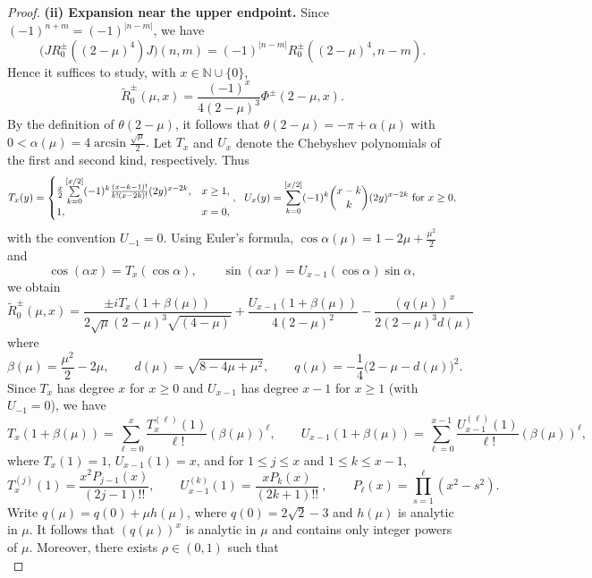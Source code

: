 \documentclass[reqno, 11pt]{amsart}
\newcommand\N{\mathbb{N}}
\numberwithin{equation}{section}
\begin{document}
\begin{proof}
\vskip0.1cm
\textbf{(ii) Expansion near the upper endpoint.}
Since $(-1)^{n+m}=(-1)^{|n-m|}$, we have
\[
\bigl(JR_0^{\pm}((2-\mu)^4)J\bigr)(n,m)
=(-1)^{|n-m|}R_0^{\pm}((2-\mu)^4,n-m).
\]
Hence it suffices to study, with $x\in\N\cup\{0\}$,
\begin{equation*}
\widetilde{R}^{\pm}_0(\mu,x)=\frac{(-1)^x}{4(2-\mu)^3}\Phi^{\pm}(2-\mu,x).
\end{equation*}
By the definition of $\theta(2-\mu)$, it follows that
$\theta(2-\mu)=-\pi+\alpha(\mu)$ with $0<\alpha(\mu)=4\arcsin{\frac{\sqrt{\mu}}{2}}.$
Let $T_x$ and $U_x$ denote the Chebyshev polynomials of the first and second kind, respectively. Thus
\[
T_x(y)=
\begin{cases}
\frac{x}{2}\sum\limits_{k=0}^{[x/2]}(-1)^k
\frac{(x-k-1)!}{k!(x-2k)!}(2y)^{x-2k},&x\geq1,\\
1,&x=0,
\end{cases},\ \ 
U_x(y)=\sum_{k=0}^{[x/2]}(-1)^k
\binom{x-k}{k}(2y)^{x-2k}\ {\rm for}\  x\geq0,
\]
with the convention $U_{-1}=0$.
Using Euler's formula, $\cos\alpha(\mu)=1-2\mu+\frac{\mu^2}{2}$ and 
$$\cos (\alpha x)=T_x(\cos \alpha),\qquad \sin (\alpha x)= U_{x-1}(\cos\alpha)\sin \alpha,$$
we obtain
\begin{equation}\label{eq:upper-cheb}
\widetilde{R}^{\pm}_0(\mu,x)=\frac{\pm iT_x(1+\beta(\mu))}{2\sqrt{\mu}(2-\mu)^3\sqrt{(4-\mu)}}+\frac{U_{x-1}(1+\beta(\mu))}{4(2-\mu)^2}-\frac{(q(\mu))^x}{2(2-\mu)^3d(\mu)}
\end{equation}
where
$$\beta(\mu)=\frac{\mu^2}{2}-2\mu,\qquad d(\mu)=\sqrt{8-4\mu+\mu^2},\qquad q(\mu)=-\frac{1}{4}\big(2-\mu-d(\mu)\big)^2.$$
Since $T_x$ has degree $x$ for $x\geq0$ and $U_{x-1}$ has degree $x-1$ for $x\geq1$ (with $U_{-1}=0$), we have
\[
T_x(1+\beta(\mu))
=\sum_{\ell=0}^{x}\frac{T_x^{(\ell)}(1)}{\ell!}(\beta(\mu))^\ell
,\qquad
U_{x-1}(1+\beta(\mu))
=\sum_{\ell=0}^{x-1}\frac{U_{x-1}^{(\ell)}(1)}{\ell!}(\beta(\mu))^\ell,
\]
where $T_x(1)=1$, $U_{x-1}(1)=x$, and for $1\leq j\leq x $ and $1\leq k\leq x-1$,
\begin{equation}\label{Tx1 Ux1}
T_x^{(j)}(1)=
    \frac{x^2 P_{j-1}(x)}
{(2j-1)!!}
,\qquad U_{x-1}^{(k)}(1)=
    \frac{xP_{k}(x)}
{(2k+1)!!}~
,\qquad P_{\ell}(x)=\displaystyle\prod_{s=1}^{\ell}(x^2-s^2).
\end{equation}
Write $q(\mu)=q(0)+\mu h(\mu)$, where $q(0)=2\sqrt{2}-3$ and  $h(\mu)$ is analytic in $\mu$. It follows that $(q(\mu))^x$ is analytic in $\mu$ and contains only integer powers
of $\mu$. Moreover, there exists $\rho\in(0,1)$ such that
\begin{equation}\label{qu}

\end{equation}
\end{proof}
\end{document}
